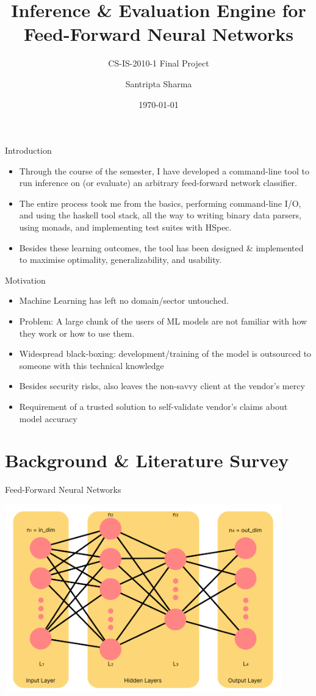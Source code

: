 \documentclass{beamer}
\title{Inference \& Evaluation Engine for Feed-Forward Neural Networks}
\subtitle{CS-IS-2010-1 Final Project}
\author{Santripta Sharma}
\date{\today}
\begin{document}
\begin{frame}
	\titlepage
\end{frame}	

\begin{frame}{Introduction}
  \begin{itemize}
    \item Through the course of the semester, I have developed a command-line tool to run inference on (or evaluate) an arbitrary feed-forward network classifier.
    \item The entire process took me from the basics, performing command-line I/O, and using the haskell tool stack, all the way to writing binary data parsers, using monads, and implementing test suites with HSpec.
    \item<2-> Besides these learning outcomes, the tool has been designed \& implemented to maximise optimality, generalizability, and usability.
  \end{itemize}
\end{frame}

\begin{frame}{Motivation}
  \begin{itemize}
    \item Machine Learning has left no domain/sector untouched.
    \item<2-> Problem: A large chunk of the users of ML models are not familiar with how
    they work or how to use them.
    \item<2-> Widespread black-boxing: development/training of the model is outsourced to someone with this technical knowledge
    \item<2-> Besides security risks, also leaves the non-savvy client at the vendor's mercy
    \item<3-> Requirement of a trusted solution to self-validate vendor's claims about model accuracy
  \end{itemize}
\end{frame}

\section{Background \& Literature Survey}
\begin{frame}{Feed-Forward Neural Networks}
  \begin{center}
    \includegraphics[width=0.9\textwidth]{../images/FFN-Structure.png}
  \end{center}
\end{frame}
\end{document}
